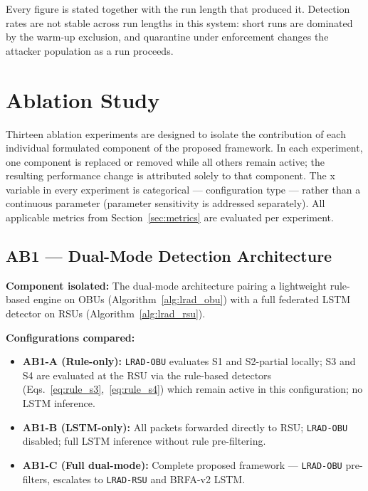 \documentclass[12pt, a4paper]{report}
\begin{document}
{{Every figure is stated together with the run length that produced it.
Detection rates are not stable across run lengths in this system:
short runs are dominated by the warm-up exclusion, and quarantine
under enforcement changes the attacker population as a run proceeds.

\section{Ablation Study}
\label{sec:ablation}

Thirteen ablation experiments are designed to isolate the
contribution of each individual formulated component of the
proposed framework. In each experiment, one component is
replaced or removed while all others remain active; the
resulting performance change is attributed solely to that
component. The x variable in every experiment is categorical
— configuration type — rather than a continuous parameter
(parameter sensitivity is addressed separately). All
applicable metrics from Section~\ref{sec:metrics} are
evaluated per experiment.

\subsection{AB1 — Dual-Mode Detection Architecture}
\label{sec:ab1}

\textbf{Component isolated:}
The dual-mode architecture pairing a lightweight rule-based
engine on \ac{OBU}s (Algorithm~\ref{alg:lrad_obu}) with a
full federated \ac{LSTM} detector on \ac{RSU}s
(Algorithm~\ref{alg:lrad_rsu}).

\textbf{Configurations compared:}
\begin{itemize}
\item \textbf{AB1-A (Rule-only):}
\texttt{LRAD-OBU} evaluates S1 and S2-partial
locally; S3 and S4 are evaluated at the \ac{RSU}
via the rule-based detectors
(Eqs.~\ref{eq:rule_s3},~\ref{eq:rule_s4}) which
remain active in this configuration; no \ac{LSTM}
inference.

    \item \textbf{AB1-B (LSTM-only):} All packets forwarded
    directly to RSU; \texttt{LRAD-OBU} disabled; full
    \ac{LSTM} inference without rule pre-filtering.
    \item \textbf{AB1-C (Full dual-mode):} Complete proposed
    framework — \texttt{LRAD-OBU} pre-filters, escalates to
    \texttt{LRAD-RSU} and BRFA-v2 \ac{LSTM}.
\end{itemize}

}}
\end{document}
